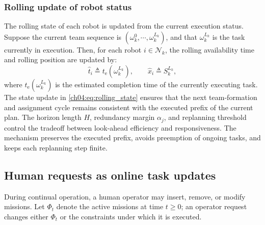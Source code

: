 \subsubsection{Rolling update of robot status}
\label{ch04:subsubsec:rolling_state_update}

The rolling state of each robot is updated from the current execution status.
Suppose the current team sequence is
$(\omega_k^0,\cdots,\omega_k^{L_k})$, and that $\omega_k^{L_k}$ is the task
currently in execution. Then, for each robot $i\in\mathcal{N}_k$, the rolling
availability time and rolling position are updated by:
\begin{equation}
\label{ch04:eq:rolling_state}
\widehat{t}_i \triangleq t_{\mathrm{e}}(\omega_k^{L_k}), \qquad
\widehat{x}_i \triangleq S_k^{L_k},
\end{equation}
where $t_{\mathrm{e}}(\omega_k^{L_k})$ is the estimated completion time of the
currently executing task. The state update in
\eqref{ch04:eq:rolling_state} ensures that the next team-formation and
assignment cycle remains consistent with the executed prefix of the current
plan.
The horizon length $H$, redundancy margin $\alpha_j$, and replanning threshold
control the tradeoff between look-ahead efficiency and responsiveness. The
mechanism preserves the executed prefix, avoids preemption of ongoing tasks, and
keeps each replanning step finite.




















\subsection{Human requests as online task updates}
\label{ch04:subsec:human_requests}

During continual operation, a human operator may insert, remove, or modify
missions.  Let $\Phi_t$ denote the
active missions at time $t\geq0$; an operator request changes either $\Phi_t$ or
the constraints under which it is executed.

